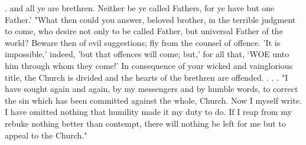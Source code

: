 . and all ye are brethren. Neither be ye called Fathers, for ye have but one Father.' "What then could you answer, beloved brother, in the terrible judgment to come, who desire not only to be called Father, but universal Father of the world? Beware then of evil suggestions; fly from the counsel of offence. 'It is impossible,’ indeed, 'but that offences will come; but,’ for all that, ‘WOE unto him through whom they come!’ In consequence of your wicked and vainglorious title, the Church is divided and the hearts of the brethren are offended. . . . "I have sought again and again, by my messengers and by humble words, to correct the sin which has been committed against the whole, Church. Now I myself write. I have omitted nothing that humility made it my duty to do. If I reap from my rebuke nothing better than contempt, there will nothing be left for me but to appeal to the Church."

